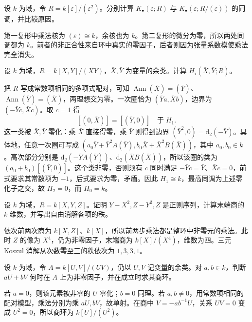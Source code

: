 \begin{exercise}\label{b3:ex:15-dual-numbers}
	设 \(k\) 为域，令 \(R=k[\varepsilon]/(\varepsilon^2)\)。分别计算 \(K_\bullet(\varepsilon;R)\) 与 \(K_\bullet(\varepsilon;R/(\varepsilon))\) 的同调，并比较原因。
\end{exercise}
\begin{solution}
	第一复形中乘法核为 \((\varepsilon)\cong k\)，余核也为 \(k\)。第二复形的微分为零，所以两处同调都为 \(k\)。前者的非正合性来自环中真实的零因子，后者则因为张量系数模使乘法完全消失。
\end{solution}

\begin{exercise}\label{b3:ex:15-crossing-homology}
	设 \(k\) 为域，\(R=k[X,Y]/(XY)\)，\(\bar X,\bar Y\) 为变量的余类。计算 \(H_i(\bar X,\bar Y;R)\)。
\end{exercise}
\begin{solution}
	把 \(R\) 写成常数项相同的多项式配对，可知 \(\operatorname{Ann}(\bar X)=(\bar Y)\)、\(\operatorname{Ann}(\bar Y)=(\bar X)\)，两理想交为零。一次圈恰为 \((\bar Ya,\bar Xb)\)，边界为 \((-\bar Yc,\bar Xc)\)。取 \(c=1\) 得
	\[
		[(0,\bar X)]=[(\bar Y,0)]\quad\text{于}\;H_1.
	\]
	这一类被 \(\bar X,\bar Y\) 零化：乘 \(\bar X\) 直接得零，乘 \(\bar Y\) 则得到边界 \((\bar Y^2,0)=\mathrm{d}_2(-\bar Y)\)。具体地，任意一次圈可写成 \((a_0\bar Y+\bar Y^2A(\bar Y),b_0\bar X+\bar X^2B(\bar X))\)，其中 \(a_0,b_0\in k\)。高次部分分别是 \(\mathrm d_2(-\bar Y A(\bar Y))\)、\(\mathrm d_2(\bar X B(\bar X))\)，所以该圈的类为 \((a_0+b_0)[(\bar Y,0)]\)。这个类非零，否则须有 \(c\) 同时满足 \(-\bar Yc=\bar Y\)、\(\bar Xc=0\)，前式要求其常数项为 \(-1\)，后式要求为零，矛盾。因此 \(H_1\cong k\)，最高同调为上述零化子之交，故 \(H_2=0\)，而 \(H_0=k\)。
\end{solution}

\begin{exercise}\label{b3:ex:15-triangular-complete-intersection}
	设 \(k\) 为域，\(R=k[X,Y,Z]\)。证明 \(Y-X^2,Z-Y^2,Z\) 是正则序列，计算末端商的 \(k\) 维数，并写出自由消解各项的秩。
\end{exercise}
\begin{solution}
	依次前两次商为 \(k[X,Z]\)、\(k[X]\)，所以前两步乘法都是整环中非零元的乘法。此时 \(Z\) 的像为 \(X^4\)，仍为非零因子，末端商为 \(k[X]/(X^4)\)，维数为四。三元 Koszul 消解从次数零至三的秩依次为 \(1,3,3,1\)。
\end{solution}

\begin{exercise}\label{b3:ex:15-component-section}
	设 \(k\) 为域，令 \(A=k[U,V]/(UV)\)，仍以 \(U,V\) 记变量的余类。对 \(a,b\in k\)，判断 \(aU+bV\) 何时在 \(A\) 上为非零因子，并在成立时求其商环。
\end{exercise}
\begin{solution}
	若 \(a=0\)，则该元素被非零的 \(U\) 零化；\(b=0\) 同理。若 \(a,b\ne0\)，用常数项相同的配对模型，乘法分别为乘 \(aU,bV\)，故单射。在商中 \(V=-ab^{-1}U\)，关系 \(UV=0\) 变成 \(U^2=0\)，所以商环为 \(k[U]/(U^2)\)。
\end{solution}

